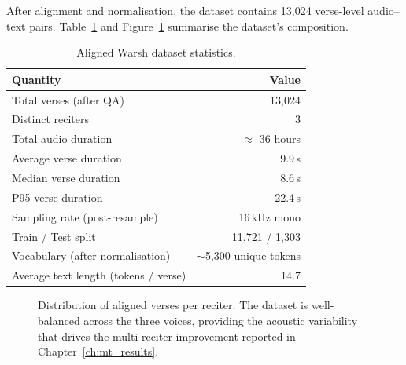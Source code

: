 After alignment and normalisation, the dataset contains 13{,}024
verse-level audio--text pairs. Table~\ref{tab:mt_dataset_stats} and
Figure~\ref{fig:mt_dataset_dist} summarise the dataset's composition.

\begin{table}[H]
  \centering
  \caption{Aligned Warsh dataset statistics.}
  \label{tab:mt_dataset_stats}
  \renewcommand{\arraystretch}{1.3}
  \begin{tabular}{lr}
    \toprule
    \textbf{Quantity} & \textbf{Value} \\
    \midrule
    Total verses (after QA)      & 13{,}024 \\
    Distinct reciters            & 3 \\
    Total audio duration         & $\approx$ 36 hours \\
    Average verse duration       & 9.9\,s \\
    Median verse duration        & 8.6\,s \\
    P95 verse duration           & 22.4\,s \\
    Sampling rate (post-resample) & 16\,kHz mono \\
    Train / Test split            & 11{,}721 / 1{,}303 \\
    Vocabulary (after normalisation) & $\sim$5{,}300 unique tokens \\
    Average text length (tokens / verse) & 14.7 \\
    \bottomrule
  \end{tabular}
\end{table}

\begin{figure}[H]
  \centering
  \caption[Reciter distribution]{Distribution of aligned verses per
  reciter. The dataset is well-balanced across the three voices, providing
  the acoustic variability that drives the multi-reciter improvement
  reported in Chapter~\ref{ch:mt_results}.}
  \label{fig:mt_dataset_dist}
\end{figure}


